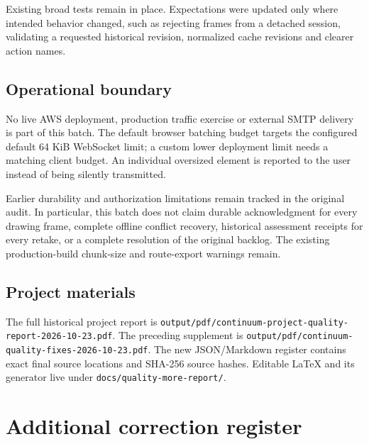 \documentclass[10pt,a4paper]{article}
\begin{document}
Existing broad tests remain in place. Expectations were updated only where intended behavior changed, such as rejecting frames from a detached session, validating a requested historical revision, normalized cache revisions and clearer action names.

\subsection{Operational boundary}
No live AWS deployment, production traffic exercise or external SMTP delivery is part of this batch. The default browser batching budget targets the configured default 64 KiB WebSocket limit; a custom lower deployment limit needs a matching client budget. An individual oversized element is reported to the user instead of being silently transmitted.

Earlier durability and authorization limitations remain tracked in the original audit. In particular, this batch does not claim durable acknowledgment for every drawing frame, complete offline conflict recovery, historical assessment receipts for every retake, or a complete resolution of the original backlog. The existing production-build chunk-size and route-export warnings remain.

\subsection{Project materials}
The full historical project report is \nolinkurl{output/pdf/continuum-project-quality-report-2026-10-23.pdf}. The preceding supplement is \nolinkurl{output/pdf/continuum-quality-fixes-2026-10-23.pdf}. The new JSON/Markdown register contains exact final source locations and SHA-256 source hashes. Editable LaTeX and its generator live under \nolinkurl{docs/quality-more-report/}.

\clearpage
\section{Additional correction register}
\small

\end{document}
